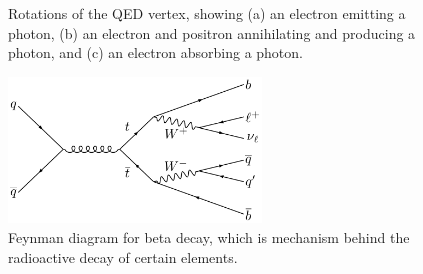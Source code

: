 \begin{figure}[htb]
    \centering
    \quad %
    \quad
    \caption{
        Rotations of the QED vertex, showing (a) an electron emitting a photon, (b) an electron and positron annihilating and producing a photon, and (c) an electron absorbing a photon. 
    }
    \label{fig:qed_rotations}
\end{figure}

\begin{figure}[htb]
    \centering
    \includegraphics[width=0.6\textwidth]{fig/feynman/ttbar/ttbar_onelep.pdf} %
    \caption{
        Feynman diagram for beta decay, which is mechanism behind the radioactive decay of certain elements. 
    }
    \label{fig:beta_decay}
\end{figure}

